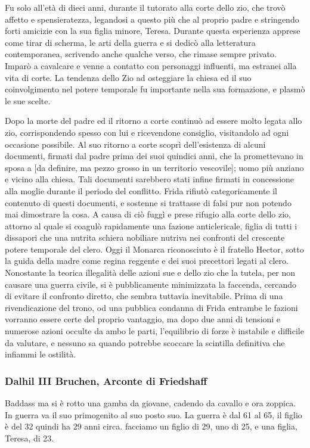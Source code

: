 Fu solo all'età di dieci anni, durante il tutorato alla corte dello zio, che trovò affetto e spensieratezza, legandosi a questo più che al proprio padre e stringendo forti amicizie con la sua figlia minore, Teresa. Durante questa esperienza apprese come tirar di scherma, le arti della guerra e si dedicò alla letteratura contemporanea, scrivendo anche qualche verso, che rimase sempre privato. Imparò a cavalcare e venne a contatto con personaggi influenti, ma estranei alla vita di corte. La tendenza dello Zio ad osteggiare la chiesa ed il suo coinvolgimento nel potere temporale fu importante nella sua formazione, e plasmò le sue scelte.

Dopo la morte del padre ed il ritorno a corte continuò ad essere molto legata allo zio, corrispondendo spesso con lui e ricevendone consiglio, visitandolo ad ogni occasione possibile. Al suo ritorno a corte scoprì dell'esistenza di alcuni documenti, firmati dal padre prima dei suoi quindici anni, che la promettevano in sposa a [da definire, ma pezzo grosso in un territorio vescovile]; uomo più anziano e vicino alla chiesa. Tali documenti sarebbero stati infine firmati in concessione alla moglie durante il periodo del conflitto. Frida rifiutò categoricamente il contenuto di questi documenti, e sostenne si trattasse di falsi pur non potendo mai dimostrare la cosa. A causa di ciò fuggì e prese rifugio alla corte dello zio, attorno al quale si coagulò rapidamente una fazione anticlericale, figlia di tutti i dissapori che una nutrita schiera nobiliare nutriva nei confronti del crescente potere temporale del clero. Oggi il Monarca riconosciuto è il fratello Hector, sotto la guida della madre come regina reggente e dei suoi precettori legati al clero. Nonostante la teorica illegalità delle azioni sue e dello zio che la tutela, per non causare una guerra civile, si è pubblicamente minimizzata la faccenda, cercando di evitare il confronto diretto, che sembra tuttavia inevitabile. Prima di una rivendicazione del trono, od una pubblica condanna di Frida entrambe le fazioni vorranno essere certe del proprio vantaggio, ma dopo due anni di tensioni e numerose azioni occulte da ambo le parti, l'equilibrio di forze è instabile e difficile da valutare, e nessuno sa quando potrebbe scoccare la scintilla definitiva che infiammi le ostilità.

\subsubsection{Dalhil III Bruchen, Arconte di Friedshaff}
Baddass ma si è rotto una gamba da giovane, cadendo da cavallo e ora zoppica.
In guerra va il suo primogenito al suo posto suo. La guerra è dal 61 al 65, il figlio è del 32 quindi ha 29 anni circa. facciamo un figlio di 29, uno di 25, e una figlia, Teresa, di 23.


\clearpage
